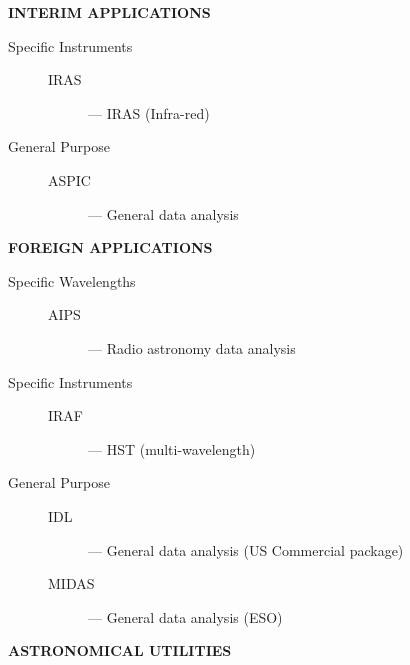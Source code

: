 \begin{center}
{\bf\Large INTERIM APPLICATIONS}
\end{center}

\begin{description}

\item [Specific Instruments] \mbox{}
\begin{description}
\item [IRAS] --- IRAS (Infra-red)
\end{description}

\item [General Purpose] \mbox{}
\begin{description}
\item [ASPIC] --- General data analysis
\end{description}

\end{description}

\begin{center}
{\bf\Large FOREIGN APPLICATIONS}
\end{center}

\begin{description}

\item [Specific Wavelengths] \mbox{}
\begin{description}
\item [AIPS] --- Radio astronomy data analysis
\end{description}

\item [Specific Instruments] \mbox{}
\begin{description}
\item [IRAF] --- HST (multi-wavelength)
\end{description}

\item [General Purpose] \mbox{}
\begin{description}
\item [IDL] --- General data analysis (US Commercial package)
\item [MIDAS] --- General data analysis (ESO)
\end{description}

\end{description}

\newpage

\begin{center}
{\bf\Large ASTRONOMICAL UTILITIES}
\end{center}

